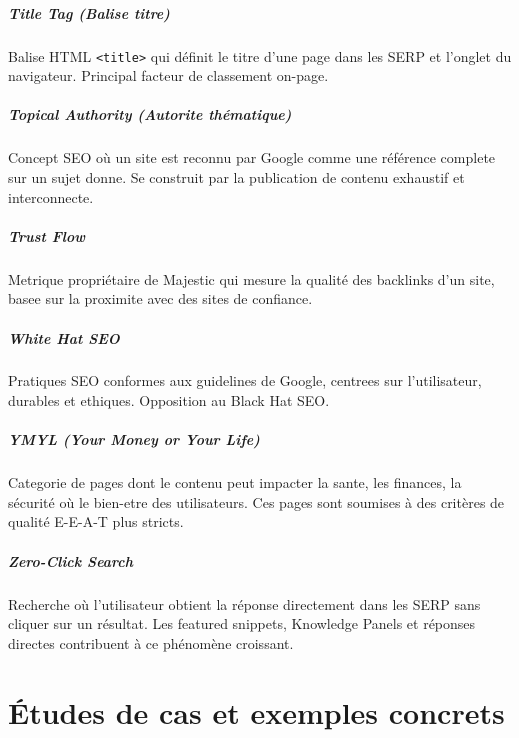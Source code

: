 \paragraph*{Title Tag (Balise titre)}
Balise HTML \texttt{<title>} qui définit le titre d'une page dans les SERP et l'onglet du navigateur. Principal facteur de classement on-page.

\paragraph*{Topical Authority (Autorite thématique)}
Concept SEO où un site est reconnu par Google comme une référence complete sur un sujet donne. Se construit par la publication de contenu exhaustif et interconnecte.

\paragraph*{Trust Flow}
Metrique propriétaire de Majestic qui mesure la qualité des backlinks d'un site, basee sur la proximite avec des sites de confiance.

\paragraph*{White Hat SEO}
Pratiques SEO conformes aux guidelines de Google, centrees sur l'utilisateur, durables et ethiques. Opposition au Black Hat SEO.

\paragraph*{YMYL (Your Money or Your Life)}
Categorie de pages dont le contenu peut impacter la sante, les finances, la sécurité où le bien-etre des utilisateurs. Ces pages sont soumises à des critères de qualité E-E-A-T plus stricts.

\paragraph*{Zero-Click Search}
Recherche où l'utilisateur obtient la réponse directement dans les SERP sans cliquer sur un résultat. Les featured snippets, Knowledge Panels et réponses directes contribuent à ce phénomène croissant.


\chapter{Études de cas et exemples concrets}
\label{ch:cas}

